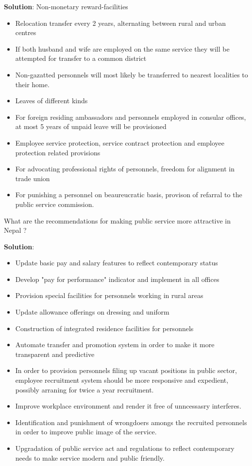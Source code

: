 \documentclass[
  openany]{book}
\newcommand{\question}{\item}
\newenvironment{solution}{ {\bfseries Solution}:}{}
\begin{document}
\begin{questions}
\begin{solution}
Non-monetary reward-facilities

\begin{itemize}
\item Relocation transfer every 2 years, alternating between rural and urban centres
\item If both husband and wife are employed on the same service they will be attempted for transfer to a common district
\item Non-gazatted personnels will most likely be transferred to nearest localities to their home.
\item Leaves of different kinds
\item For foreign residing ambassadors and personnels employed in consular offices, at most 5 years of unpaid leave will be provisioned
\item Employee service protection, service contract protection and employee protection related provisions
\item For advocating professional rights of personnels, freedom for alignment in trade union
\item For punishing a personnel on beaureucratic basis, provison of refarral to the public service commission.
\end{itemize}

\end{solution}

\question What are the recommendations for making public service more attractive in Nepal ?

\begin{solution}
\begin{itemize}
\item Update basic pay and salary features to reflect contemporary status
\item Develop "pay for performance" indicator and implement in all offices
\item Provision special facilities for personnels working in rural areas
\item Update allowance offerings on dressing and uniform
\item Construction of integrated residence facilities for personnels
\item Automate transfer and promotion system in order to make it more transparent and predictive
\item In order to provision personnels filing up vacant positions in public sector, employee recruitment system should be more responsive and expedient, possibly arraning for twice a year recruitment.
\item Improve workplace environment and render it free of unncessasry interferes.
\item Identification and punishment of wrongdoers amongs the recruited personnels in order to improve public image of the service.
\item Upgradation of public service act and regulations to reflect contemporary needs to make service modern and public friendly.
\end{itemize}


\end{solution}
\end{questions}
\end{document}
